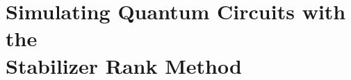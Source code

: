 
\chapter[Simulating Quantum Circuits with Stabilizer Rank]{Simulating Quantum Circuits with the\\ Stabilizer Rank Method}
\label{chap:simulator}

